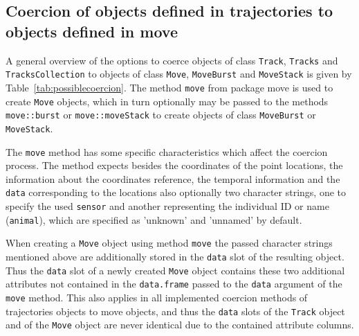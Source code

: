 \documentclass[12pt, oneside, a4paper]{scrbook}
\newcommand{\pkg}[1]{{\normalfont\fontseries{b}\selectfont #1}}
\let\code=\texttt
\begin{document}
\subsection*{Coercion of objects defined in \pkg{trajectories} to objects defined in \pkg{move}}
\label{subsec:coercetrajtomove}

A general overview of the options to coerce objects of class \code{Track}, \code{Tracks} and \code{TracksCollection} to objects of class \code{Move}, \code{MoveBurst} and \code{MoveStack} is given by Table~\ref{tab:possiblecoercion}. The method \code{move} from package \pkg{move} is used to create \code{Move} objects, which in turn optionally may be passed to the methods \code{move::burst} or \code{move::moveStack} to create objects of class \code{MoveBurst} or \code{MoveStack}.

\par\medskip

The \code{move} method has some specific characteristics which affect the coercion process.
The method expects besides the coordinates of the point locations, the information about the coordinates reference, the temporal information and the \code{data} corresponding to the locations also optionally two character strings, one to specify the used \code{sensor} and another representing the individual ID or name (\code{animal}), which are specified as 'unknown' and 'unnamed' by default.

\par\medskip

When creating a \code{Move} object using method \code{move} the passed character strings mentioned above are additionally stored in the \code{data} slot of the resulting object. Thus the \code{data} slot of a newly created \code{Move} object contains these two additional attributes not contained in the \code{data.frame} passed to the \code{data} argument of the \code{move} method.
This also applies in all implemented coercion methods of \pkg{trajectories} objects to \pkg{move} objects, and thus the \code{data} slots of the \code{Track} object and of the \code{Move} object are never identical due to the contained attribute columns.

\par\medskip
\end{document}
